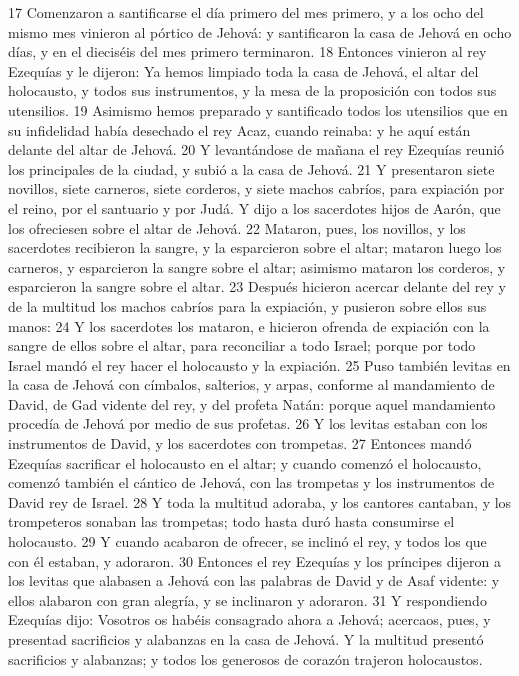 17 Comenzaron a santificarse el día primero del mes primero, y a los ocho del mismo mes vinieron al pórtico de Jehová: y santificaron la casa de Jehová en ocho días, y en el dieciséis del mes primero terminaron.
18 Entonces vinieron al rey Ezequías y le dijeron: Ya hemos limpiado toda la casa de Jehová, el altar del holocausto, y todos sus instrumentos, y la mesa de la proposición con todos sus utensilios.
19 Asimismo hemos preparado y santificado todos los utensilios que en su infidelidad había desechado el rey Acaz, cuando reinaba: y he aquí están delante del altar de Jehová.
20 Y levantándose de mañana el rey Ezequías reunió los principales de la ciudad, y subió a la casa de Jehová.
21 Y presentaron siete novillos, siete carneros, siete corderos, y siete machos cabríos, para expiación por el reino, por el santuario y por Judá. Y dijo a los sacerdotes hijos de Aarón, que los ofreciesen sobre el altar de Jehová.
22 Mataron, pues, los novillos, y los sacerdotes recibieron la sangre, y la esparcieron sobre el altar; mataron luego los carneros, y esparcieron la sangre sobre el altar; asimismo mataron los corderos, y esparcieron la sangre sobre el altar.
23 Después hicieron acercar delante del rey y de la multitud los machos cabríos para la expiación, y pusieron sobre ellos sus manos:
24 Y los sacerdotes los mataron, e hicieron ofrenda de expiación con la sangre de ellos sobre el altar, para reconciliar a todo Israel; porque por todo Israel mandó el rey hacer el holocausto y la expiación.
25 Puso también levitas en la casa de Jehová con címbalos, salterios, y arpas, conforme al mandamiento de David, de Gad vidente del rey, y del profeta Natán: porque aquel mandamiento procedía de Jehová por medio de sus profetas.
26 Y los levitas estaban con los instrumentos de David, y los sacerdotes con trompetas.
27 Entonces mandó Ezequías sacrificar el holocausto en el altar; y cuando comenzó el holocausto, comenzó también el cántico de Jehová, con las trompetas y los instrumentos de David rey de Israel.
28 Y toda la multitud adoraba, y los cantores cantaban, y los trompeteros sonaban las trompetas; todo hasta duró hasta consumirse el holocausto.
29 Y cuando acabaron de ofrecer, se inclinó el rey, y todos los que con él estaban, y adoraron.
30 Entonces el rey Ezequías y los príncipes dijeron a los levitas que alabasen a Jehová con las palabras de David y de Asaf vidente: y ellos alabaron con gran alegría, y se inclinaron y adoraron.
31 Y respondiendo Ezequías dijo: Vosotros os habéis consagrado ahora a Jehová; acercaos, pues, y presentad sacrificios y alabanzas en la casa de Jehová. Y la multitud presentó sacrificios y alabanzas; y todos los generosos de corazón trajeron holocaustos.

